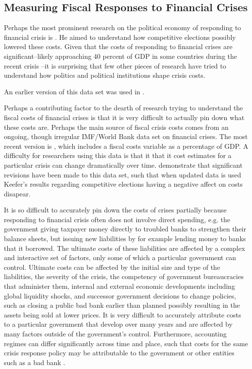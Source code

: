 \documentclass[]{article}
\begin{document}
\subsection*{Measuring Fiscal Responses to Financial Crises}



Perhaps the most prominent research on the political economy of responding to financial crisis is \cite{Keefer2007}. He aimed to understand how competitive elections possibly lowered these costs. Given that the costs of responding to financial crises are significant--likely approaching 40 percent of GDP in some countries during the recent crisis \cite{laeven2013}--it is surprising that few other pieces of research have tried to understand how politics and political institutions shape crisis costs.

 An earlier version of this data set was used in \cite{Keefer2007}.

Perhaps a contributing factor to the dearth of research trying to understand the fiscal costs of financial crises is that it is very difficult to actually pin down what these costs are. Perhaps the main source of fiscal crisis costs comes from an ongoing, though irregular IMF/World Bank data set on financial crises. The most recent version is \cite{laeven2013}, which includes a fiscal costs variable as a percentage of GDP. A difficulty for researchers using this data is that it that it cost estimates for a particular crisis can change dramatically over time. \cite{GandrudHallerberg2015} demonstrate that significant revisions have been made to this data set, such that when updated data is used Keefer's \citeyearpar{Keefer2007} results regarding competitive elections having a negative affect on costs disapear.

It is so difficult to accurately pin down the costs of crises partially because responding to financial crisis often does not involve direct spending, e.g. the government giving taxpayer money directly to troubled banks to strengthen their balance sheets, but issuing new liabilities by for example lending money to banks that it borrowed. The ultimate costs of these liabilities are affected by a complex and interactive set of factors, only some of which a particular government can control. Ultimate costs can be affected by the initial size and type of the liabilities, the severity of the crisis, the competency of government bureaucracies that administer them, internal and external economic developments including global liquidity shocks, and successor government decisions to change policies, such as closing a public bad bank earlier than planned possibly resulting in the assets being sold at lower prices. It is very difficult to accurately attribute costs to a particular government that develop over many years and are affected by many factors outside of the government's control. Furthermore, accounting regimes can differ significantly across time and place, such that costs for the same crisis response policy may be attributable to the government or other entities such as a bad bank \citep{gandrudHallerbergWEP}.
\end{document}
